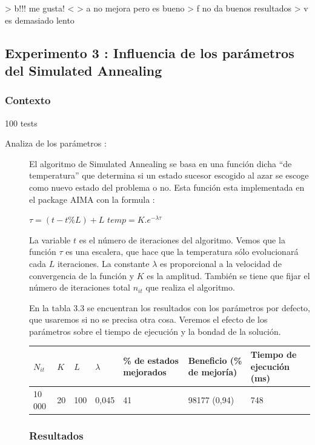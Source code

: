 \documentclass{article}
\begin{document}
> b!!! me gusta! <
> a no mejora pero es bueno
> f no da buenos resultados
> v es demasiado lento

\subsection{Experimento 3 : Influencia de los parámetros del Simulated
Annealing}

\subsubsection{Contexto}
100 tests
\begin{description}
\item[Analiza de los parámetros :] El algoritmo de Simulated Annealing se basa
en una función dicha ``de temperatura'' que determina si un estado sucesor
escogido al azar se escoge como nuevo estado del problema o no. Esta función
esta implementada en el package AIMA con la formula :
\begin{center}
$\tau = (t-t\%L)+L$
$temp = K.e^{-\lambda \tau}$
\end{center}
La variable $t$ es el número de iteraciones del algoritmo. Vemos que la función
$\tau$ es una escalera, que hace que la temperatura sólo evolucionará cada $L$
iteraciones. La constante $\lambda$ es proporcional a la velocidad de
convergencia de la función y $K$ es la amplitud. También se tiene que fijar el
número de iteraciones total $n_{it}$ que realiza el algoritmo.

En la tabla 3.3 se encuentran los resultados con los parámetros por defecto, que
usaremos si no se precisa otra cosa. Veremos el efecto de los parámetros sobre
el tiempo de ejecución y la bondad de la solución.

\begin{tabular}{|l|l|l|l||l|l|l|}
\hline
$N_{it}$ & $K$ & $L$ & $\lambda$ & \% de estados mejorados & Beneficio (\% de
mejoría) & Tiempo de ejecución (ms)\\
\hline
10 000 & 20 & 100 & 0,045 & 41 & 98177 (0,94) & 748\\
\hline
\end{tabular}

\subsubsection{Resultados}


\end{description}
\end{document}
